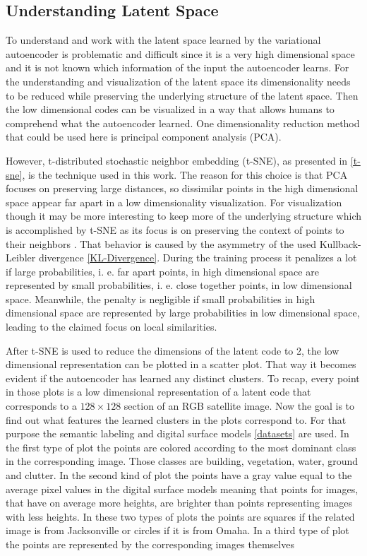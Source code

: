 \subsection{Understanding Latent Space}

To understand and work with the latent space learned by the variational autoencoder is problematic and
difficult since it is a very high dimensional space and it is not known which information of the input the
autoencoder learns. For the understanding and visualization of the latent space its dimensionality needs
to be reduced while preserving the underlying structure of the latent space. Then the low dimensional
codes can be visualized in a way that allows humans to comprehend what the autoencoder learned.
One dimensionality reduction method that could be used here is principal component analysis (PCA).

However,
t-distributed stochastic neighbor embedding (t-SNE), as presented in \ref{t-sne}, is the technique used in this work.
The reason for this choice is that PCA focuses on preserving large distances, so dissimilar points in the
high dimensional space appear far apart in a low dimensionality visualization. For visualization though
it may be more interesting to keep more of the underlying structure which is accomplished by t-SNE as its
focus is on preserving the context of points to their neighbors \parencite{2008-vanDerMaaten-visualizing}.
That behavior is caused by the asymmetry of the used Kullback-Leibler divergence \ref{KL-Divergence}.
During the training process it penalizes a lot if large probabilities, i. e. far apart points, in high dimensional
space are represented by small probabilities, i. e. close together points, in low dimensional space. Meanwhile, the 
penalty is negligible if small probabilities in high dimensional space are represented by large probabilities in
low dimensional space, leading to the claimed focus on local similarities.

After t-SNE is used to reduce the dimensions of the latent code to 2, the low dimensional representation can be
plotted in a scatter plot. That way it becomes evident if the autoencoder has learned any distinct clusters.
To recap, every point in those plots is a low dimensional representation of a latent code that corresponds to
a $128 \times 128$ section of an RGB satellite image. 
Now the goal is to find out what features the learned clusters in the plots correspond to. For that purpose the
semantic labeling and digital surface models \ref{datasets} are used. In the first type of plot the points
are colored according to the most dominant class in the corresponding image. Those classes are building, vegetation,
water, ground and clutter. In the second kind of plot the points have a gray value equal to the average pixel
values in the digital surface models meaning that points for images, that have on average more heights, are brighter
than points representing images with less heights.
In these two types of plots the points are squares if the related image is from Jacksonville or circles if it is from
Omaha. In a third type of plot the points are represented by the corresponding images themselves 

